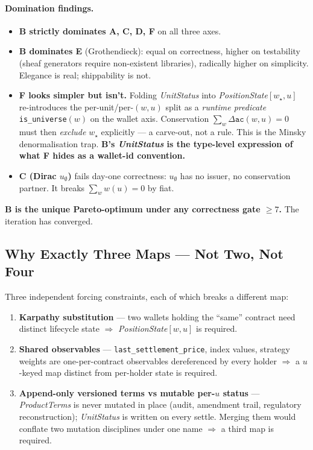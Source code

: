 \documentclass[11pt,a4paper]{article}
\begin{document}
\paragraph{Domination findings.}
\begin{itemize}[leftmargin=*]
\item \textbf{B strictly dominates A, C, D, F} on all three axes.
\item \textbf{B dominates E} (Grothendieck): equal on correctness, higher on testability (sheaf generators require non-existent libraries), radically higher on simplicity. Elegance is real; shippability is not.
\item \textbf{F looks simpler but isn't.} Folding \textit{UnitStatus} into \textit{PositionState}$[w_\star, u]$ re-introduces the per-unit/per-$(w,u)$ split as a \emph{runtime predicate} \texttt{is\_universe}$(w)$ on the wallet axis. Conservation $\sum_w \Delta \texttt{ac}(w, u) = 0$ must then \emph{exclude} $w_\star$ explicitly --- a carve-out, not a rule. This is the Minsky denormalisation trap. \textbf{B's \textit{UnitStatus} is the type-level expression of what F hides as a wallet-id convention.}
\item \textbf{C (Dirac $u_\emptyset$)} fails day-one correctness: $u_\emptyset$ has no issuer, no conservation partner. It breaks $\sum_w w(u) = 0$ by fiat.
\end{itemize}

\noindent \textbf{B is the unique Pareto-optimum under any correctness gate $\geq 7$.} The iteration has converged.

\subsection{Why Exactly Three Maps --- Not Two, Not Four}

Three independent forcing constraints, each of which breaks a different map:

\begin{enumerate}[leftmargin=*]
\item \textbf{Karpathy substitution} --- two wallets holding the ``same'' contract need distinct lifecycle state $\Rightarrow$ \textit{PositionState}$[w, u]$ is required.
\item \textbf{Shared observables} --- \texttt{last\_settlement\_price}, index values, strategy weights are one-per-contract observables dereferenced by every holder $\Rightarrow$ a $u$-keyed map distinct from per-holder state is required.
\item \textbf{Append-only versioned terms vs mutable per-$u$ status} --- \textit{ProductTerms} is never mutated in place (audit, amendment trail, regulatory reconstruction); \textit{UnitStatus} is written on every settle. Merging them would conflate two mutation disciplines under one name $\Rightarrow$ a third map is required.
\end{enumerate}
\end{document}
